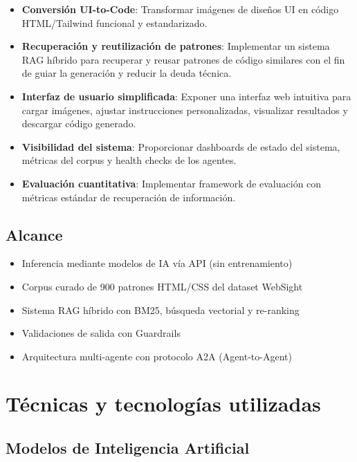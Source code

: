 \documentclass[12pt,a4paper]{article}
\begin{document}
\begin{itemize}[leftmargin=*]
    \item \textbf{Conversión UI-to-Code}: Transformar imágenes de diseños UI en código HTML/Tailwind funcional y estandarizado.
    
    \item \textbf{Recuperación y reutilización de patrones}: Implementar un sistema RAG híbrido para recuperar y reusar patrones de código similares con el fin de guiar la generación y reducir la deuda técnica.
    
    \item \textbf{Interfaz de usuario simplificada}: Exponer una interfaz web intuitiva para cargar imágenes, ajustar instrucciones personalizadas, visualizar resultados y descargar código generado.
    
    \item \textbf{Visibilidad del sistema}: Proporcionar dashboards de estado del sistema, métricas del corpus y health checks de los agentes.
    
    \item \textbf{Evaluación cuantitativa}: Implementar framework de evaluación con métricas estándar de recuperación de información.
\end{itemize}

\subsection{Alcance}

\begin{itemize}
    \item Inferencia mediante modelos de IA vía API (sin entrenamiento)
    \item Corpus curado de 900 patrones HTML/CSS del dataset WebSight
    \item Sistema RAG híbrido con BM25, búsqueda vectorial y re-ranking
    \item Validaciones de salida con Guardrails
    \item Arquitectura multi-agente con protocolo A2A (Agent-to-Agent)
\end{itemize}

\section{Técnicas y tecnologías utilizadas}

\subsection{Modelos de Inteligencia Artificial}
\end{document}
